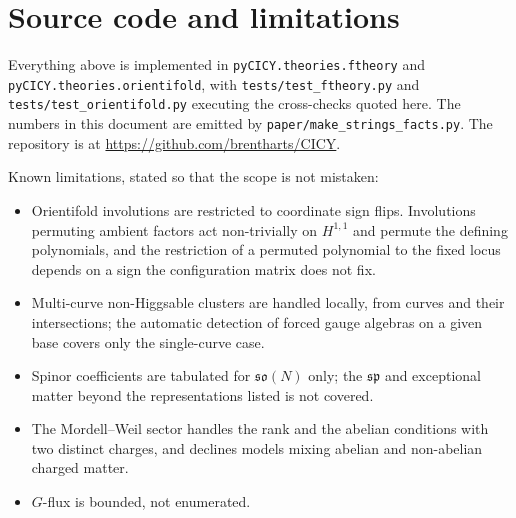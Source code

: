 \documentclass[11pt,a4paper]{article}
\newcommand{\g}[1]{\mathfrak{#1}}
\theoremstyle{definition}
\begin{document}
\section{Source code and limitations}
\label{sec:source}

Everything above is implemented in \texttt{pyCICY.theories.ftheory} and
\texttt{pyCICY.theories.orientifold}, with
\texttt{tests/test\_ftheory.py} and \texttt{tests/test\_orientifold.py}
executing the cross-checks quoted here. The numbers in this document are
emitted by \texttt{paper/make\_strings\_facts.py}. The repository is at
\url{https://github.com/brentharts/CICY}.

Known limitations, stated so that the scope is not mistaken:
%
\begin{itemize}[leftmargin=2em,itemsep=1pt]
\item Orientifold involutions are restricted to coordinate sign flips.
Involutions permuting ambient factors act non-trivially on $H^{1,1}$ and
permute the defining polynomials, and the restriction of a permuted polynomial
to the fixed locus depends on a sign the configuration matrix does not fix.
\item Multi-curve non-Higgsable clusters are handled locally, from curves and
their intersections; the automatic detection of forced gauge algebras on a
given base covers only the single-curve case.
\item Spinor coefficients are tabulated for $\g{so}(N)$ only; the $\g{sp}$ and
exceptional matter beyond the representations listed is not covered.
\item The Mordell--Weil sector handles the rank and the abelian conditions
with two distinct charges, and declines models mixing abelian and non-abelian
charged matter.
\item $G$-flux is bounded, not enumerated.
\end{itemize}

\end{document}
